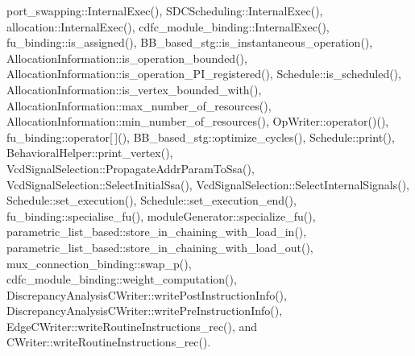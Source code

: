 port\+\_\+swapping\+::\+Internal\+Exec(), S\+D\+C\+Scheduling\+::\+Internal\+Exec(), allocation\+::\+Internal\+Exec(), cdfc\+\_\+module\+\_\+binding\+::\+Internal\+Exec(), fu\+\_\+binding\+::is\+\_\+assigned(), B\+B\+\_\+based\+\_\+stg\+::is\+\_\+instantaneous\+\_\+operation(), Allocation\+Information\+::is\+\_\+operation\+\_\+bounded(), Allocation\+Information\+::is\+\_\+operation\+\_\+\+P\+I\+\_\+registered(), Schedule\+::is\+\_\+scheduled(), Allocation\+Information\+::is\+\_\+vertex\+\_\+bounded\+\_\+with(), Allocation\+Information\+::max\+\_\+number\+\_\+of\+\_\+resources(), Allocation\+Information\+::min\+\_\+number\+\_\+of\+\_\+resources(), Op\+Writer\+::operator()(), fu\+\_\+binding\+::operator\mbox{[}$\,$\mbox{]}(), B\+B\+\_\+based\+\_\+stg\+::optimize\+\_\+cycles(), Schedule\+::print(), Behavioral\+Helper\+::print\+\_\+vertex(), Vcd\+Signal\+Selection\+::\+Propagate\+Addr\+Param\+To\+Ssa(), Vcd\+Signal\+Selection\+::\+Select\+Initial\+Ssa(), Vcd\+Signal\+Selection\+::\+Select\+Internal\+Signals(), Schedule\+::set\+\_\+execution(), Schedule\+::set\+\_\+execution\+\_\+end(), fu\+\_\+binding\+::specialise\+\_\+fu(), module\+Generator\+::specialize\+\_\+fu(), parametric\+\_\+list\+\_\+based\+::store\+\_\+in\+\_\+chaining\+\_\+with\+\_\+load\+\_\+in(), parametric\+\_\+list\+\_\+based\+::store\+\_\+in\+\_\+chaining\+\_\+with\+\_\+load\+\_\+out(), mux\+\_\+connection\+\_\+binding\+::swap\+\_\+p(), cdfc\+\_\+module\+\_\+binding\+::weight\+\_\+computation(), Discrepancy\+Analysis\+C\+Writer\+::write\+Post\+Instruction\+Info(), Discrepancy\+Analysis\+C\+Writer\+::write\+Pre\+Instruction\+Info(), Edge\+C\+Writer\+::write\+Routine\+Instructions\+\_\+rec(), and C\+Writer\+::write\+Routine\+Instructions\+\_\+rec().

